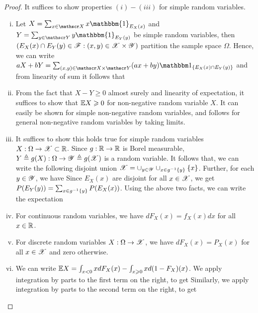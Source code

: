 \documentclass[letterpaper,10pt,english]{article}
\begin{document}
\begin{proof}
It suffices to show properties $(i)-(iii)$ for simple random variables. 
\begin{enumerate}[(i)]
\item Let $X = \sum_{x \in \sX}x\mathbbm{1}_{E_X(x)}$ and $Y =  \sum_{y \in \sY}y\mathbbm{1}_{E_Y(y)}$ be simple random variables, then $(E_X(x)\cap E_Y(y) \in \mathscr{F}: (x, y)\in \mathscr{X} \times \mathscr{Y})$ partition the sample space $\Omega$. 
Hence, we can write $aX + bY = \sum_{(x,y) \in \sX \times \sY}(ax+by)\SetIn{E_X(x)\cap E_Y(y)}$ and from linearity of sum it follows that
\item From the fact that $X-Y \ge 0$ almost surely and linearity of expectation, 
it suffices to show that $\mathbb{E} X \geqslant 0$ for non-negative random variable $X$. 
It can easily be shown for simple non-negative random variables, 
and follows for general non-negative random variables by taking limits. 

\item It suffices to show this holds true for simple random variables $X: \Omega \to \mathscr{X} \subset \mathbb{R}$. 
Since $g: \mathbb{R} \to \mathbb{R}$ is Borel measurable, $Y \triangleq g(X): \Omega\to\mathscr{Y} \triangleq g(\mathscr{X})$ is a random variable. 
It follows that, we can write the following disjoint union $\mathscr{X} = \cup_{y\in \mathscr{Y}}\cup_{x \in g^{-1}\left\{y\right\}}\left\{x\right\}$. 
Further, for each $y \in \mathscr{Y}$, we have 
Since $E_X(x)$ are disjoint for all $x \in \mathscr{X}$, we get $P(E_Y(y)) = \sum_{x \in g^{-1}\left\{y\right\}}P(E_X(x))$. 
Using the above two facts, we can write the expectation 
  
\item For continuous random variables, we have $dF_X(x) = f_X(x)dx$ for all $x \in \mathbb{R}$. 
\item For discrete random variables $X : \Omega \to \mathscr{X}$, we have $dF_X(x) = P_X(x)$ for all $x \in \mathscr{X}$ and zero otherwise. 
\item We can write $\mathbb{E} X = \int_{x <0}xdF_X(x)-\int_{x \geqslant 0}xd(1-F_X)(x)$. 
We apply integration by parts to the first term on the right, to get 
Similarly, we apply integration by parts to the second term on the right, to get 
\end{enumerate}
\end{proof}
\end{document}
